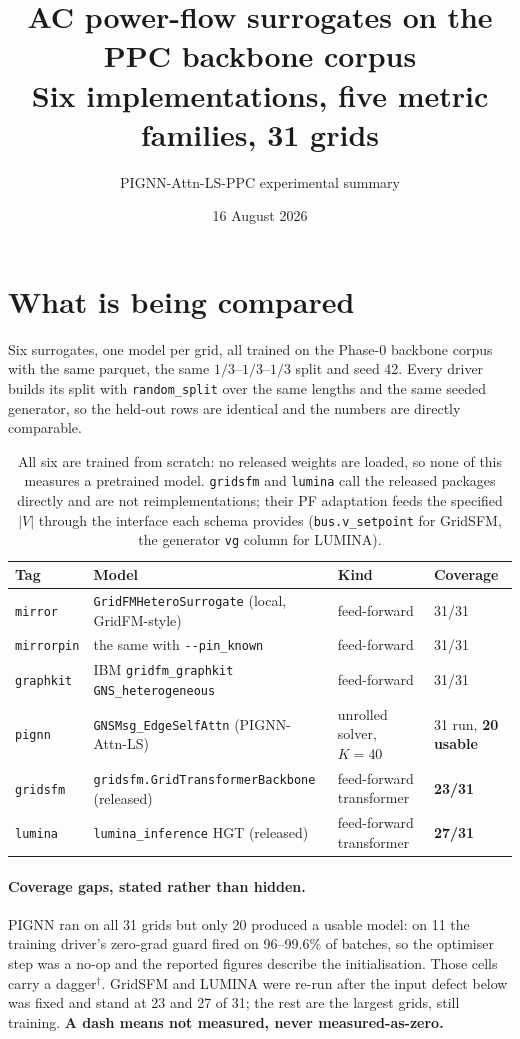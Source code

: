 \documentclass[10pt]{article}
\title{AC power-flow surrogates on the PPC backbone corpus\\
\large Six implementations, five metric families, 31 grids}
\author{PIGNN-Attn-LS-PPC experimental summary}
\date{16 August 2026}
\begin{document}
\maketitle

\section{What is being compared}

Six surrogates, one model per grid, all trained on the Phase-0 backbone corpus
with the same parquet, the same $1/3$--$1/3$--$1/3$ split and seed 42. Every
driver builds its split with \texttt{random\_split} over the same lengths and
the same seeded generator, so the held-out rows are identical and the numbers
are directly comparable.

\begin{table}[H]
\centering\small
\begin{tabular}{llll}
\toprule
Tag & Model & Kind & Coverage \\
\midrule
\texttt{mirror}    & \texttt{GridFMHeteroSurrogate} (local, GridFM-style) & feed-forward & 31/31 \\
\texttt{mirrorpin} & the same with \texttt{-{}-pin\_known}                & feed-forward & 31/31 \\
\texttt{graphkit}  & IBM \texttt{gridfm\_graphkit} \texttt{GNS\_heterogeneous} & feed-forward & 31/31 \\
\texttt{pignn}     & \texttt{GNSMsg\_EdgeSelfAttn} (PIGNN-Attn-LS)        & unrolled solver, $K=40$ & 31 run, \textbf{20 usable} \\
\texttt{gridsfm}   & \texttt{gridsfm.GridTransformerBackbone} (released)  & feed-forward transformer & \textbf{23/31} \\
\texttt{lumina}    & \texttt{lumina\_inference} HGT (released)            & feed-forward transformer & \textbf{27/31} \\
\bottomrule
\end{tabular}
\caption{All six are trained from scratch: no released weights are loaded, so
none of this measures a pretrained model. \texttt{gridsfm} and \texttt{lumina}
call the released packages directly and are not reimplementations; their PF
adaptation feeds the specified $|V|$ through the interface each schema provides
(\texttt{bus.v\_setpoint} for GridSFM, the generator \texttt{vg} column for
LUMINA).}
\end{table}

\paragraph{Coverage gaps, stated rather than hidden.} PIGNN ran on all 31 grids
but only 20 produced a usable model: on 11 the training driver's zero-grad guard
fired on 96--99.6\% of batches, so the optimiser step was a no-op and the
reported figures describe the initialisation. Those cells carry a
dagger$^\dagger$. GridSFM and LUMINA were re-run after the input defect below
was fixed and stand at 23 and 27 of 31; the rest are the largest grids, still
training. \textbf{A dash means not measured, never measured-as-zero.}
\end{document}
